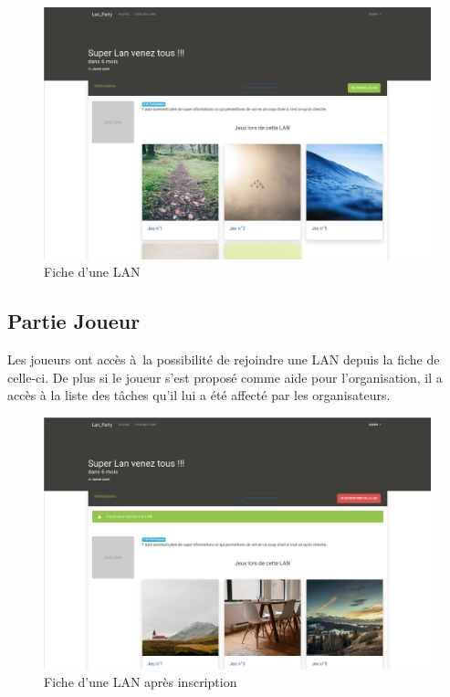\documentclass[12pt]{article}
\begin{document}
\begin{figure}[H]
\centering
\includegraphics[scale=0.20]{images/fiche_lan.png}
\caption{Fiche d'une LAN}
\label{}
\end{figure}

\subsection{Partie Joueur}

Les joueurs ont accès à la possibilité de rejoindre une LAN depuis la fiche de celle-ci. De plus si le joueur s'est proposé comme aide pour l'organisation, il a accès à la liste des tâches qu'il lui a été affecté par les organisateurs.

\begin{figure}[H]
\centering
\includegraphics[scale=0.20]{images/inscrit.png}
\caption{Fiche d'une LAN après inscription}
\label{}
\end{figure}
\end{document}
